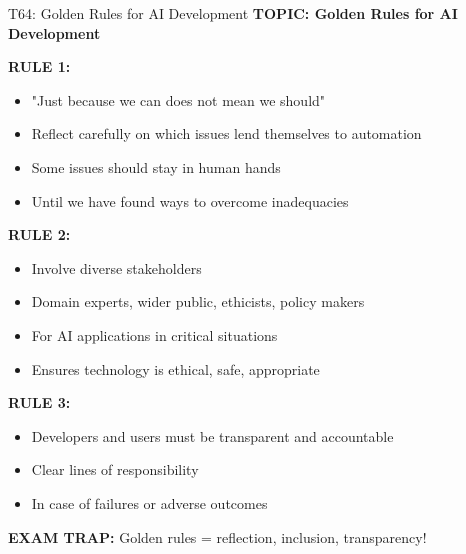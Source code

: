 \documentclass[8pt]{beamer}
\begin{document}
	\begin{frame}{T64: Golden Rules for AI Development}
		\fontsize{6.5}{7.5}\selectfont
		\textbf{TOPIC: Golden Rules for AI Development}
		
		\vspace{0.1cm}
		\textbf{RULE 1:}
		\begin{itemize}
			\item "Just because we can does not mean we should"
			\item Reflect carefully on which issues lend themselves to automation
			\item Some issues should stay in human hands
			\item Until we have found ways to overcome inadequacies
		\end{itemize}
		
		\vspace{0.1cm}
		\textbf{RULE 2:}
		\begin{itemize}
			\item Involve diverse stakeholders
			\item Domain experts, wider public, ethicists, policy makers
			\item For AI applications in critical situations
			\item Ensures technology is ethical, safe, appropriate
		\end{itemize}
		
		\vspace{0.1cm}
		\textbf{RULE 3:}
		\begin{itemize}
			\item Developers and users must be transparent and accountable
			\item Clear lines of responsibility
			\item In case of failures or adverse outcomes
		\end{itemize}
		
		\textcolor{myred}{\textbf{EXAM TRAP:}} Golden rules = \textcolor{myblue}{reflection, inclusion, transparency}!
	\end{frame}
	
	
\end{document}
